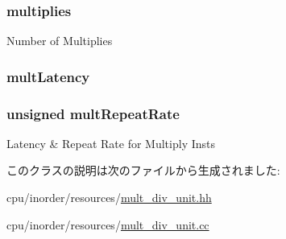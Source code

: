 \label{classMultDivUnit_ab6780ac541ff360807ea8d60676f16ed}
\hypertarget{classMultDivUnit_a93c0b82f201329738735dced68546cbc}{
\subsubsection[{multiplies}]{ {\bf multiplies}}}
\label{classMultDivUnit_a93c0b82f201329738735dced68546cbc}
Number of Multiplies \hypertarget{classMultDivUnit_a3de390a21e916001149c87429bf1e217}{
\subsubsection[{multLatency}]{ {\bf multLatency}}}
\label{classMultDivUnit_a3de390a21e916001149c87429bf1e217}
\hypertarget{classMultDivUnit_a1871d85be78df55fa08769481a3d3d4e}{
\subsubsection[{multRepeatRate}]{\setlength{\rightskip}{0pt plus 5cm}unsigned {\bf multRepeatRate}}}
\label{classMultDivUnit_a1871d85be78df55fa08769481a3d3d4e}
Latency \& Repeat Rate for Multiply Insts 

このクラスの説明は次のファイルから生成されました:\begin{DoxyCompactItemize}
\item 
cpu/inorder/resources/\hyperlink{mult__div__unit_8hh}{mult\_\-div\_\-unit.hh}\item 
cpu/inorder/resources/\hyperlink{mult__div__unit_8cc}{mult\_\-div\_\-unit.cc}\end{DoxyCompactItemize}
